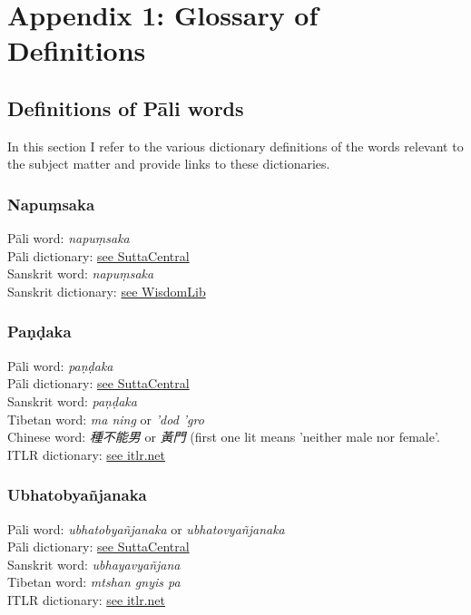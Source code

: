 \section{Appendix 1: Glossary of Definitions}
\label{appendix1}

\subsection{Definitions of Pāli words}
In this section I refer to the various dictionary definitions of the words relevant to the subject matter and provide links to these dictionaries.

\subsubsection{Napuṃsaka}
Pāli word: {\em napuṃsaka} \\
Pāli dictionary: \href{https://suttacentral.net/define/napu%E1%B9%83saka}{see SuttaCentral} \\
Sanskrit word: {\em napuṃsaka} \\
Sanskrit dictionary: \href{https://www.wisdomlib.org/definition/napumsaka}{see WisdomLib} \\

\subsubsection{Paṇḍaka}
Pāli word: {\em paṇḍaka} \\
Pāli dictionary: \href{https://suttacentral.net/define/pa%E1%B9%87%E1%B8%8Daka}{see SuttaCentral} \\
Sanskrit word: {\em paṇḍaka} \\
Tibetan word: {\em ma ning} or {\em ’dod ’gro} \\
Chinese word: {\em 種不能男} or {\em 黃門} (first one lit means 'neither male nor female'.\\
ITLR dictionary: \href{http://www.itlr.net/hwid:281142}{see itlr.net} \\

\subsubsection{Ubhatob­yañ­janaka}
Pāli word: {\em ubhatob­yañ­janaka} or {\em ubhatovyañ­janaka} \\
Pāli dictionary: \href{https://suttacentral.net/define/ubhatovya%C3%B1janaka}{see SuttaCentral} \\
Sanskrit word: {\em ubhayavyañjana} \\
Tibetan word: {\em mtshan gnyis pa} \\
ITLR dictionary: \href{http://www.itlr.net/hwid:62844}{see itlr.net} \\

